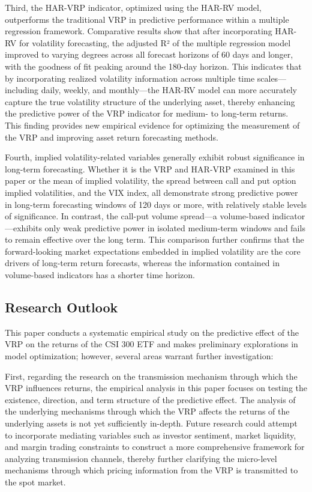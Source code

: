 \documentclass[a4paper, 12pt]{article}    %
\begin{document}
Third, the HAR-VRP indicator, optimized using the HAR-RV model, outperforms the traditional VRP in predictive performance within a multiple regression framework. Comparative results show that after incorporating HAR-RV for volatility forecasting, the adjusted R² of the multiple regression model improved to varying degrees across all forecast horizons of 60 days and longer, with the goodness of fit peaking around the 180-day horizon. This indicates that by incorporating realized volatility information across multiple time scales—including daily, weekly, and monthly—the HAR-RV model can more accurately capture the true volatility structure of the underlying asset, thereby enhancing the predictive power of the VRP indicator for medium- to long-term returns. This finding provides new empirical evidence for optimizing the measurement of the VRP and improving asset return forecasting methods.

Fourth, implied volatility-related variables generally exhibit robust significance in long-term forecasting. Whether it is the VRP and HAR-VRP examined in this paper or the mean of implied volatility, the spread between call and put option implied volatilities, and the VIX index, all demonstrate strong predictive power in long-term forecasting windows of 120 days or more, with relatively stable levels of significance. In contrast, the call-put volume spread—a volume-based indicator—exhibits only weak predictive power in isolated medium-term windows and fails to remain effective over the long term. This comparison further confirms that the forward-looking market expectations embedded in implied volatility are the core drivers of long-term return forecasts, whereas the information contained in volume-based indicators has a shorter time horizon.


\subsection{Research Outlook}
This paper conducts a systematic empirical study on the predictive effect of the VRP on the returns of the CSI 300 ETF and makes preliminary explorations in model optimization; however, several areas warrant further investigation:

First, regarding the research on the transmission mechanism through which the VRP influences returns, the empirical analysis in this paper focuses on testing the existence, direction, and term structure of the predictive effect. The analysis of the underlying mechanisms through which the VRP affects the returns of the underlying assets is not yet sufficiently in-depth. Future research could attempt to incorporate mediating variables such as investor sentiment, market liquidity, and margin trading constraints to construct a more comprehensive framework for analyzing transmission channels, thereby further clarifying the micro-level mechanisms through which pricing information from the VRP is transmitted to the spot market.
\end{document}
